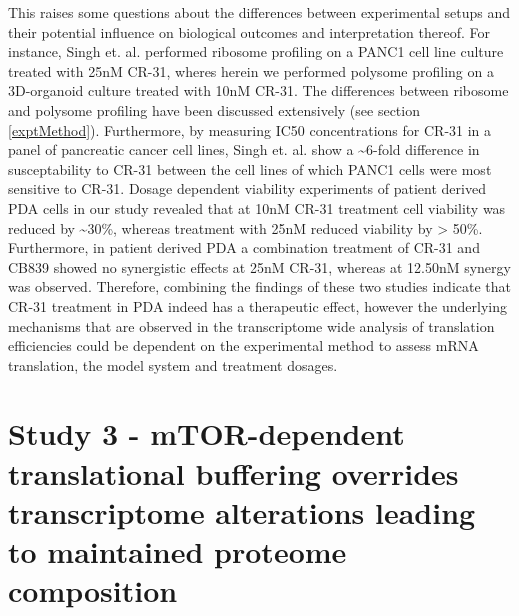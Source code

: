 \documentclass[12pt,openany]{book}
\begin{document}
This raises some questions about the differences between experimental
setups and their potential influence on biological outcomes and
interpretation thereof. For instance, Singh et. al. performed ribosome
profiling on a PANC1 cell line culture treated with 25nM CR-31, wheres
herein we performed polysome profiling on a 3D-organoid culture treated
with 10nM CR-31. The differences between ribosome and polysome profiling
have been discussed extensively (see section \ref{exptMethod}).
Furthermore, by measuring IC50 concentrations for CR-31 in a panel of
pancreatic cancer cell lines, Singh et. al. show a
\textasciitilde{}6-fold difference in susceptability to CR-31 between
the cell lines of which PANC1 cells were most sensitive to CR-31. Dosage
dependent viability experiments of patient derived PDA cells in our
study revealed that at 10nM CR-31 treatment cell viability was reduced
by \textasciitilde{}30\%, whereas treatment with 25nM reduced viability
by \textgreater{} 50\%. Furthermore, in patient derived PDA a
combination treatment of CR-31 and CB839 showed no synergistic effects
at 25nM CR-31, whereas at 12.50nM synergy was observed. Therefore,
combining the findings of these two studies indicate that CR-31
treatment in PDA indeed has a therapeutic effect, however the underlying
mechanisms that are observed in the transcriptome wide analysis of
translation efficiencies could be dependent on the experimental method
to assess mRNA translation, the model system and treatment dosages.

\section{Study 3 - mTOR-dependent translational buffering overrides transcriptome alterations leading to
maintained proteome composition}
\end{document}
